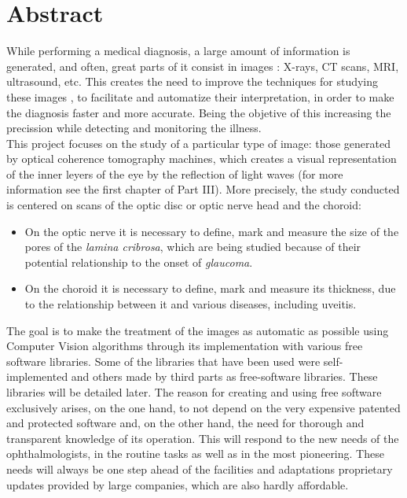 \newpage

\section*{Abstract}
While performing a medical diagnosis, a large amount of information is
generated, and often, great parts of it consist in images \emph{\citep*[1. The Analysis of Medical Images, 2. Digital Image
  Acquisition]{toennies2012guide}}: X-rays, CT scans, MRI, ultrasound,
etc. This creates the need to improve the techniques for studying
these images \emph{\citep*[4. Image Enhancement]{toennies2012guide}},
to facilitate and automatize their interpretation, in order to make
the diagnosis faster and more accurate. Being the objetive of this increasing the 
precission while detecting and monitoring the illness.\\
This project focuses on the study of a particular type of image: those
generated by optical coherence tomography machines, which creates a
visual representation of the inner leyers of the eye by the reflection
of light waves (for more information see the first chapter of Part
III). More precisely, the study conducted is centered on scans of the
optic disc or optic nerve head and the choroid:
\begin{itemize}
\item On the optic nerve it is necessary to define, mark and measure
  the size of the pores of the \emph{lamina cribrosa}, which are being
  studied because of their potential relationship to the onset of \emph{glaucoma}.
\item On the choroid it is necessary to define, mark and measure its
  thickness, due to the relationship between it and various diseases, including uveitis.
\end{itemize}
The goal is to make the treatment of the images as automatic as
possible using Computer Vision algorithms through its implementation
with various free software libraries. Some of the libraries that have
been used were self-implemented and others made by third parts as
free-software libraries. These libraries will be detailed later. The
reason for creating and using free software exclusively arises, on the
one hand, to not depend on the very expensive patented and protected
software and, on the other hand, the need for thorough and transparent
knowledge of its operation. This will respond to the new needs of the
ophthalmologists,  in the routine tasks as well as in the most
pioneering. These needs will always be one step ahead of the
facilities and adaptations proprietary updates provided by large
companies, which are also hardly affordable.